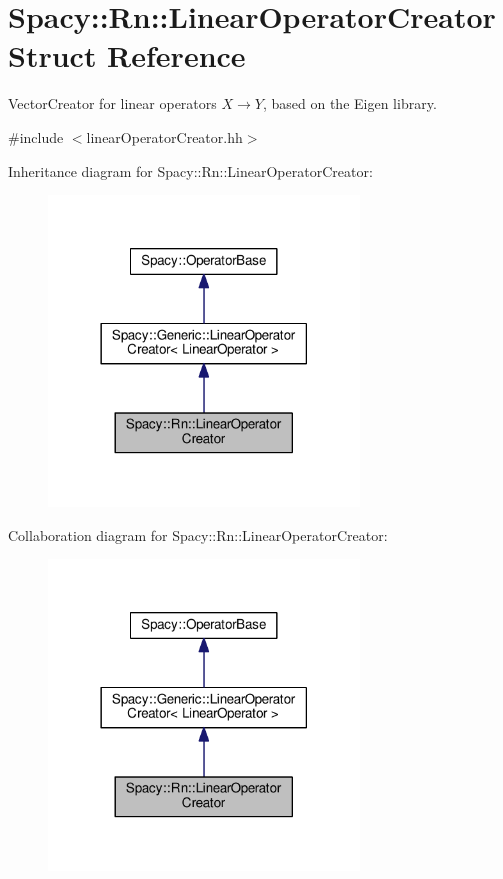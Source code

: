 \hypertarget{structSpacy_1_1Rn_1_1LinearOperatorCreator}{}\section{Spacy\+:\+:Rn\+:\+:Linear\+Operator\+Creator Struct Reference}
\label{structSpacy_1_1Rn_1_1LinearOperatorCreator}


Vector\+Creator for linear operators $X\rightarrow Y$, based on the Eigen library.  




{\ttfamily \#include $<$linear\+Operator\+Creator.\+hh$>$}



Inheritance diagram for Spacy\+:\+:Rn\+:\+:Linear\+Operator\+Creator\+:\nopagebreak
\begin{figure}[H]
\begin{center}
\leavevmode
\includegraphics[width=234pt]{structSpacy_1_1Rn_1_1LinearOperatorCreator__inherit__graph}
\end{center}
\end{figure}


Collaboration diagram for Spacy\+:\+:Rn\+:\+:Linear\+Operator\+Creator\+:\nopagebreak
\begin{figure}[H]
\begin{center}
\leavevmode
\includegraphics[width=234pt]{structSpacy_1_1Rn_1_1LinearOperatorCreator__coll__graph}
\end{center}
\end{figure}
